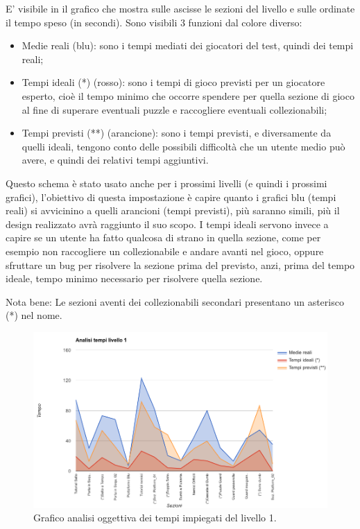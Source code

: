 E' visibile in \myfig{\ref{fig:test_analisi_tempi_01}}  il grafico che mostra sulle ascisse le sezioni del livello e sulle ordinate il tempo speso (in secondi). Sono visibili 3 funzioni dal colore diverso:

\begin{itemize}

\item Medie reali (blu): sono i tempi mediati dei giocatori del test, quindi dei tempi reali;
\item Tempi ideali (*) (rosso): sono i tempi di gioco previsti per un giocatore esperto, cioè il tempo minimo che occorre spendere per quella sezione di gioco al fine di superare eventuali puzzle e raccogliere eventuali collezionabili;
\item Tempi previsti (**) (arancione): sono i tempi previsti, e diversamente da quelli ideali, tengono conto delle possibili difficoltà che un utente medio può avere, e quindi dei relativi tempi aggiuntivi.

\end {itemize}

Questo schema è stato usato anche per i prossimi livelli (e quindi i prossimi grafici), l'obiettivo di questa impostazione è capire quanto i grafici blu (tempi reali) si avvicinino a quelli arancioni (tempi previsti), più saranno simili, più il design realizzato avrà raggiunto il suo scopo. I tempi ideali servono invece a capire se un utente ha fatto qualcosa di strano in quella sezione, come per esempio non raccogliere un collezionabile e andare avanti nel gioco, oppure sfruttare un bug per risolvere la sezione prima del previsto, anzi, prima del tempo ideale, tempo minimo necessario per risolvere quella sezione.

Nota bene: Le sezioni aventi dei collezionabili secondari presentano un asterisco (*) nel nome. 

\begin{figure}[h]
\centerline{\includegraphics[scale=0.45]{images/risultati/test_01_analisi_tempi_01.png}}
\caption{Grafico analisi oggettiva dei tempi impiegati del livello 1.}
\label{fig:test_analisi_tempi_01}
\end{figure}


